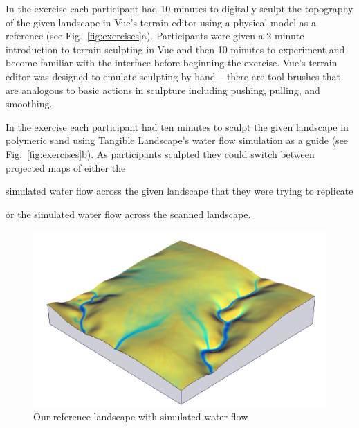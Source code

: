 \documentclass{isprs}
\begin{document}

In the  exercise 
each participant had 10 minutes to digitally sculpt the topography of the given landscape in Vue's terrain editor
using a physical model as a reference (see Fig.~\ref{fig:exercises}a).
Participants were given a 2 minute introduction to terrain sculpting in Vue and then 10 minutes to experiment and become familiar with the interface before beginning the exercise. Vue's terrain editor was designed to emulate sculpting by hand -- there are tool brushes that are analogous to basic actions in sculpture including pushing, pulling, and smoothing. 

In the  exercise each participant had ten minutes to  
sculpt the given landscape in polymeric sand
using Tangible Landscape's water flow simulation
as a guide (see Fig.~\ref{fig:exercises}b). 
%
As participants sculpted they could switch between projected maps of either the
\begin{enumerate*}[label=\alph*),font=\itshape]
\item simulated water flow across the given landscape that they were trying to replicate
\item or the simulated water flow across the scanned landscape.
\end{enumerate*}

\begin{figure}[ht!]
\begin{center}
\includegraphics[width=1.0\columnwidth]{figures/depth_3d.png}
\caption{Our reference landscape with simulated water flow}
\label{fig:study_area}
\end{center}
\end{figure}
\end{document}
